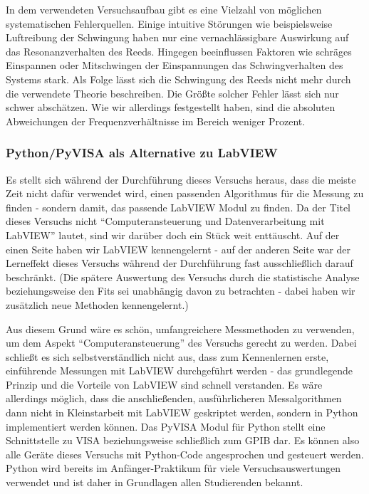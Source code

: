 In dem verwendeten Versuchsaufbau gibt es eine Vielzahl von möglichen systematischen Fehlerquellen.
Einige intuitive Störungen wie beispielsweise Luftreibung der Schwingung haben nur eine vernachlässigbare Auswirkung auf das Resonanzverhalten des Reeds.
Hingegen beeinflussen Faktoren wie schräges Einspannen oder Mitschwingen der Einspannungen das Schwingverhalten des Systems stark.
Als Folge lässt sich die Schwingung des Reeds nicht mehr durch die verwendete Theorie beschreiben.
Die Größte solcher Fehler lässt sich nur schwer abschätzen.
Wie wir allerdings festgestellt haben, sind die absoluten Abweichungen der Frequenzverhältnisse im Bereich weniger Prozent.

\subsubsection*{Python/PyVISA als Alternative zu LabVIEW}

Es stellt sich während der Durchführung dieses Versuchs heraus, dass die meiste Zeit nicht dafür verwendet wird, einen passenden Algorithmus für die Messung zu finden - sondern damit, das passende LabVIEW Modul zu finden.
Da der Titel dieses Versuchs nicht \enquote{Computeransteuerung und Datenverarbeitung mit LabVIEW} lautet, sind wir darüber doch ein Stück weit enttäuscht.
Auf der einen Seite haben wir LabVIEW kennengelernt - auf der anderen Seite war der Lerneffekt dieses Versuchs während der Durchführung fast ausschließlich darauf beschränkt.
(Die spätere Auswertung des Versuchs durch die statistische Analyse beziehungsweise den Fits sei unabhängig davon zu betrachten - dabei haben wir zusätzlich neue Methoden kennengelernt.)

Aus diesem Grund wäre es schön, umfangreichere Messmethoden zu verwenden, um dem Aspekt \enquote{Computeransteuerung} des Versuchs gerecht zu werden.
Dabei schließt es sich selbstverständlich nicht aus, dass zum Kennenlernen erste, einführende Messungen mit LabVIEW durchgeführt werden - das grundlegende Prinzip und die Vorteile von LabVIEW sind schnell verstanden.
Es wäre allerdings möglich, dass die anschließenden, ausführlicheren Messalgorithmen dann nicht in Kleinstarbeit mit LabVIEW geskriptet werden, sondern in Python implementiert werden können.
Das PyVISA Modul für Python stellt eine Schnittstelle zu VISA beziehungsweise schließlich zum GPIB dar.
Es können also alle Geräte dieses Versuchs mit Python-Code angesprochen und gesteuert werden.
Python wird bereits im Anfänger-Praktikum für viele Versuchsauswertungen verwendet und ist daher in Grundlagen allen Studierenden bekannt.

